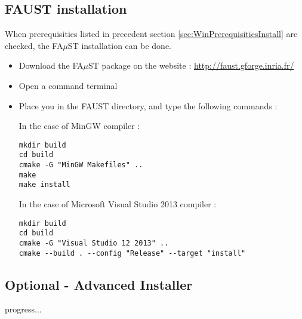 \subsection{FAUST installation}\label{sec:WinFaustInstall}
When prerequisities listed in precedent section \ref{sec:WinPrerequisitiesInstall} are checked, the FA$\mu$ST installation can be done. 
\begin{itemize}
\item Download the FA$\mu$ST package on the website :  \url{http://faust.gforge.inria.fr/}
\item Open a command terminal
\item Place you in the FAUST directory, and type the following commands : 

In the case of MinGW compiler :
\begin{lstlisting}
mkdir build
cd build
cmake -G "MinGW Makefiles" .. 
make
make install
\end{lstlisting}

In the case of Microsoft Visual Studio 2013 compiler :
\begin{lstlisting}
mkdir build
cd build
cmake -G "Visual Studio 12 2013" .. 
cmake --build . --config "Release" --target "install"
\end{lstlisting}

\end{itemize}


\subsection{Optional - Advanced Installer}\label{sec:WinOptionalInstall}

progress... 



